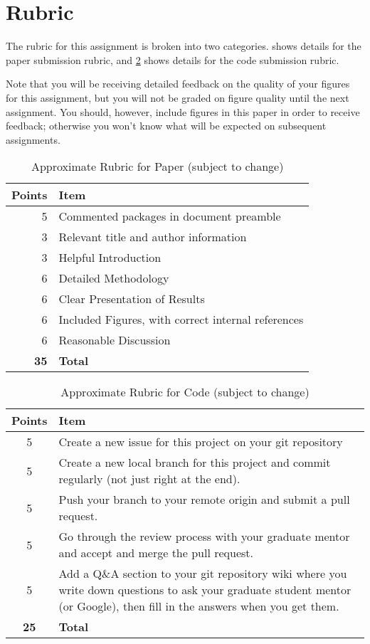\documentclass[12pt]{article}
\begin{document}
\section{Rubric}

The rubric for this assignment is broken into two categories. 
 shows details for the paper submission rubric, and
\cref{tab:coderubric} shows details for the code submission rubric.

Note that you will be receiving detailed feedback on the quality of your figures for this assignment, but you will not be graded on figure quality until the next assignment.
You should, however, include figures in this paper in order to receive feedback; otherwise you won't know what will be expected on subsequent assignments.

\begin{table}[h!]
	\caption{Approximate Rubric for Paper (subject to change)}
	\label{tab:paperrubric}
	\renewcommand{\arraystretch}{1.2}
	\vspace{1em}
	\begin{tabular}{r|p{5in}}
		\textbf{Points} & \textbf{Item} \\ 
		\hline
		5 & Commented packages in document preamble \\
		3 & Relevant title and author information \\
		3 & Helpful Introduction \\
		6 & Detailed Methodology \\
		6 & Clear Presentation of Results \\
		6 & Included Figures, with correct internal references \\
		6 & Reasonable Discussion \\
		\textbf{35} & \textbf{Total}
	\end{tabular}
\end{table}

\begin{table}[h!]
	\caption{Approximate Rubric for Code (subject to change)}
	\label{tab:coderubric}
	\renewcommand{\arraystretch}{1.2}
	\vspace{1em}
	\begin{tabular}{c|p{5in}}
		\textbf{Points} & \textbf{Item} \\ 
		\hline
		5 & Create a new issue for this project on your git repository\\
		5 & Create a new local branch for this project and commit regularly (not just right at the end). \\
		5 & Push your branch to your remote origin and submit a pull request.\\
		5 & Go through the review process with your graduate mentor and accept and merge the pull request. \\
		5 & Add a Q\&A section to your git repository wiki where you write down questions to ask your graduate student mentor (or Google), then fill in the answers when you get them. \\
		\textbf{25} & \textbf{Total}
	\end{tabular}
\end{table}
	
\end{document}
